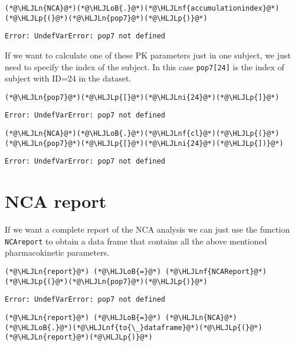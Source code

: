 \documentclass[12pt,a4paper]{article}
\newcommand{\HLJLn}[1]{#1}
\newcommand{\HLJLnf}[1]{\textcolor[RGB]{66,102,213}{#1}}
\newcommand{\HLJLni}[1]{\textcolor[RGB]{59,151,46}{#1}}
\newcommand{\HLJLoB}[1]{\textcolor[RGB]{102,102,102}{\textbf{#1}}}
\newcommand{\HLJLp}[1]{#1}
\begin{document}
\begin{lstlisting}
(*@\HLJLn{NCA}@*)(*@\HLJLoB{.}@*)(*@\HLJLnf{accumulationindex}@*)(*@\HLJLp{(}@*)(*@\HLJLn{pop7}@*)(*@\HLJLp{)}@*)
\end{lstlisting}

\begin{lstlisting}
Error: UndefVarError: pop7 not defined
\end{lstlisting}


If we want to calculate one of these PK parameters just in one subject, we just need to specify the index of the subject. In this case \texttt{pop7[24]} is the index of subject with ID=24 in the dataset.


\begin{lstlisting}
(*@\HLJLn{pop7}@*)(*@\HLJLp{[}@*)(*@\HLJLni{24}@*)(*@\HLJLp{]}@*)
\end{lstlisting}

\begin{lstlisting}
Error: UndefVarError: pop7 not defined
\end{lstlisting}


\begin{lstlisting}
(*@\HLJLn{NCA}@*)(*@\HLJLoB{.}@*)(*@\HLJLnf{cl}@*)(*@\HLJLp{(}@*)(*@\HLJLn{pop7}@*)(*@\HLJLp{[}@*)(*@\HLJLni{24}@*)(*@\HLJLp{])}@*)
\end{lstlisting}

\begin{lstlisting}
Error: UndefVarError: pop7 not defined
\end{lstlisting}


\section{NCA report}
If we want a complete report of the NCA analysis we can just use the function \texttt{NCAreport} to obtain a data frame that contains all the above mentioned pharmacokinetic parameters.


\begin{lstlisting}
(*@\HLJLn{report}@*) (*@\HLJLoB{=}@*) (*@\HLJLnf{NCAReport}@*)(*@\HLJLp{(}@*)(*@\HLJLn{pop7}@*)(*@\HLJLp{)}@*)
\end{lstlisting}

\begin{lstlisting}
Error: UndefVarError: pop7 not defined
\end{lstlisting}


\begin{lstlisting}
(*@\HLJLn{report}@*) (*@\HLJLoB{=}@*) (*@\HLJLn{NCA}@*)(*@\HLJLoB{.}@*)(*@\HLJLnf{to{\_}dataframe}@*)(*@\HLJLp{(}@*)(*@\HLJLn{report}@*)(*@\HLJLp{)}@*)
\end{lstlisting}
\end{document}
